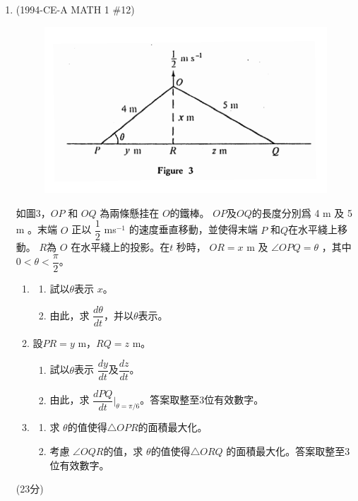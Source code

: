 \documentclass[12pt]{article}
\begin{document}
\begin{enumerate}
            \hrulefill
            
            \hrulefill
            
            \hrulefill
            
            \hrulefill

        \pagebreak
        \item (1994-CE-A MATH 1 \#12) 
        \begin{figure}[H]
            \centering
            \includegraphics[scale=1.4]{1994CE_A_MATH_1_12.png}
        \end{figure}
        如圖3，$OP$ 和 $OQ$ 為兩條懸挂在 $O$的鐵棒。 $OP$及$OQ$的長度分別爲 4 m 及 5 m 。末端 $O$ 正以 $\dfrac{1}{2}$ ms$^{-1}$ 的速度垂直移動，並使得末端 $P$ 和$Q$在水平綫上移動。 $R$為 $O$ 在水平綫上的投影。在$t$ 秒時， $OR = x$ m 及 $\angle OPQ=\theta$ ，其中$0<\theta<\dfrac{\pi}{2}$。\begin{enumerate}
            \item \begin{enumerate}
                \item 試以$\theta$表示 $x$。 
                \item 由此，求 $\dfrac{d\theta}{dt}$，并以$\theta$表示。
            \end{enumerate}
            \item 設$PR=y$ m，$RQ=z$ m。\begin{enumerate}
                \item 試以$\theta$表示 $\dfrac{dy}{dt}$及$\dfrac{dz}{dt}$。
                \item 由此，求 $\dfrac{d PQ}{dt}|_{\theta=\pi/6}$。答案取整至3位有效數字。
            \end{enumerate}
            \item \begin{enumerate}
                \item 求 $\theta$的值使得$\triangle OPR$的面積最大化。
                \item 考慮 $\angle OQR$的值，求 $\theta$的值使得$\triangle ORQ$ 的面積最大化。答案取整至3位有效數字。
            \end{enumerate} 
        \end{enumerate}\hfill(23分)


\end{enumerate}
\end{document}
